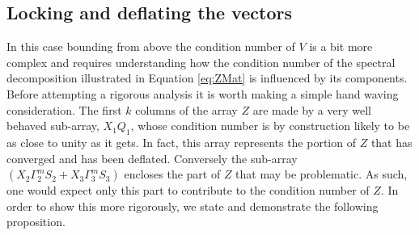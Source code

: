 \subsection{Locking and deflating the vectors}
\label{sec-3-3}
In this case bounding from above the condition number of $V$ is a bit more complex and requires understanding how the condition number of the spectral decomposition illustrated in Equation \eqref{eq:ZMat} is influenced by its components. Before attempting a rigorous analysis it is worth making a simple hand waving consideration. The first $k$ columns of the array $Z$ are made by a very well behaved sub-array, $X_1Q_1$, whose condition number is by construction likely to be as close to unity as it gets. In fact, this array represents the portion of $Z$ that has converged and has been deflated. Conversely the sub-array $\left(X_2 \Gamma_2^m S_2 + X_3 \Gamma_3^m S_3 \right)$ encloses the part of $Z$ that may be problematic. As such, one would expect only this part to contribute to the condition number of $Z$. In order to show this more rigorously, we state and demonstrate the following proposition.

